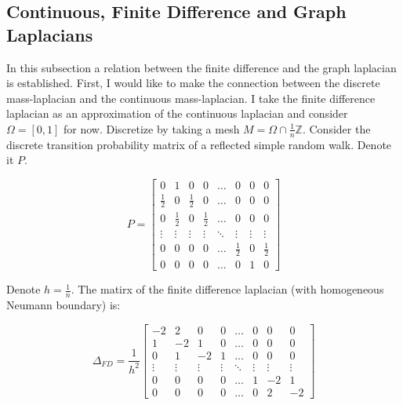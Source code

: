 \documentclass[paper=a4, fontsize=11pt]{scrartcl} %
\numberwithin{equation}{section} %
\numberwithin{figure}{section} %
\numberwithin{table}{section} %
\begin{document}
\subsection{Continuous, Finite Difference and Graph Laplacians}
In this subsection a relation between the finite difference and the graph
laplacian is established.
First, I would like to make the connection between the discrete mass-laplacian and the
continuous mass-laplacian. I take the finite difference laplacian as an 
approximation of the continuous laplacian and consider $\Omega =[0,1]$  
for now. Discretize by taking a mesh $M = \Omega \cap \frac{1}{n} \mathbb{Z}$.
Consider the discrete transition probability matrix of a reflected simple random walk. 
Denote it $P$.

\[
P =
\begin{bmatrix}
  0            & 1            & 0           & 0              & \dots       & 0             & 0      &0            \\
  \frac{1}{2}  & 0            & \frac{1}{2} & 0              & \dots       & 0             & 0      &0            \\   
  0            & \frac{1}{2}  & 0           & \frac{1}{2}    & \dots       & 0             & 0      &0            \\ 
  \vdots       & \vdots       & \vdots      & \vdots         & \ddots      & \vdots        & \vdots &\vdots       \\
  0            & 0            & 0           &0               & \dots       & \frac{1}{2}   & 0      &\frac{1}{2}  \\
  0            & 0            & 0           &0               & \dots       & 0             & 1      &0            
\end{bmatrix}
\]

Denote $h = \frac{1}{n}$. The matirx of the finite difference
laplacian (with homogeneous Neumann boundary) is:

\[
\Delta_{FD} = \frac{1}{h^2}
\begin{bmatrix}
  -2           & 2           & 0           & 0              & \dots       & 0             & 0      &0            \\
  1            & -2           & 1           & 0              & \dots       & 0             & 0      &0            \\   
  0            & 1            & -2          & 1              & \dots       & 0             & 0      &0            \\ 
  \vdots       & \vdots       & \vdots      & \vdots         & \ddots      & \vdots        & \vdots &\vdots       \\
  0            & 0            & 0           &0               & \dots       & 1             & -2     &1            \\
  0            & 0            & 0           &0               & \dots       & 0             & 2      &-2           
\end{bmatrix}
\]
\end{document}
